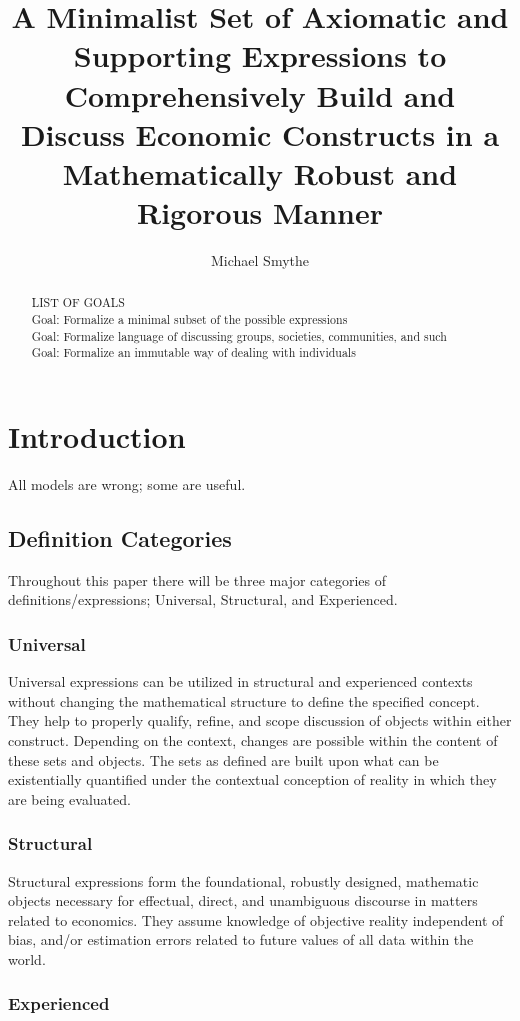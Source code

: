 \documentclass[]{article}
\title{A Minimalist Set of Axiomatic and Supporting Expressions to Comprehensively Build and Discuss Economic Constructs in a Mathematically Robust and Rigorous Manner}
\author{Michael Smythe}
\begin{document}
\maketitle

\begin{abstract}
LIST OF GOALS
\\Goal: Formalize a minimal subset of the possible expressions
\\Goal: Formalize language of discussing groups, societies, communities, and such
\\Goal: Formalize an immutable way of dealing with individuals
\end{abstract}
\section*{Introduction}
All models are wrong; some are useful. 
\subsection*{Definition Categories}
Throughout this paper there will be three major categories of definitions/expressions; Universal, Structural, and Experienced.
%
\subsubsection*{Universal}
Universal expressions can be utilized in structural and experienced contexts without changing the mathematical structure to define the specified concept. They help to properly qualify, refine, and scope discussion of objects within either construct. Depending on the context, changes are possible within the content of these sets and objects. The sets as defined are built upon what can be existentially quantified under the contextual conception of reality in which they are being evaluated.   
%
\subsubsection*{Structural}
Structural expressions form the foundational, robustly designed, mathematic objects necessary for effectual, direct, and unambiguous discourse in matters related to economics. They assume knowledge of objective reality independent of bias, and/or estimation errors related to future values of all data within the world.    
%
\subsubsection*{Experienced}
\end{document}
